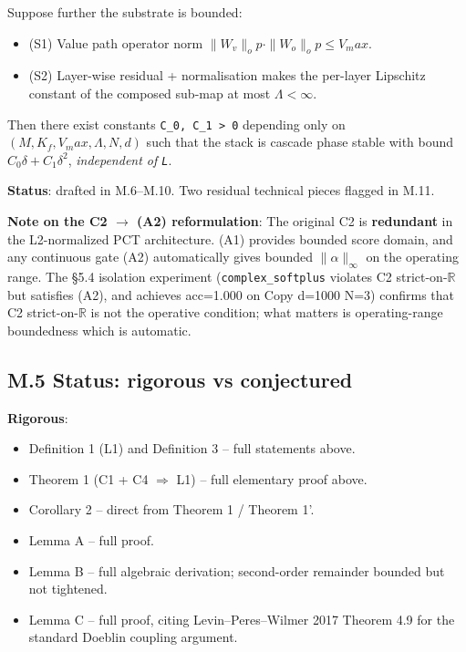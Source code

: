 \documentclass[11pt,a4paper]{article}
\theoremstyle{plain}
\theoremstyle{definition}
\begin{document}
Suppose further the substrate is bounded:

\begin{itemize}
  \item (S1) Value path operator norm $\|W_v\|_op \cdot  \|W_o\|_op \le  V_max$.
  \item (S2) Layer-wise residual + normalisation makes the per-layer Lipschitz constant of the composed sub-map at most $\Lambda  < \infty $.
\end{itemize}

Then there exist constants \texttt{C\_0, C\_1 > 0} depending only on $(M, K_f, V_max, \Lambda , N, d)$ such that the stack is cascade phase stable with bound $C_0 \delta  + C_1 \delta ^2$, \emph{independent of \texttt{L}}.

\textbf{Status}: drafted in M.6--M.10. Two residual technical pieces flagged in M.11.

\textbf{Note on the C2 $\to$ (A2) reformulation}: The original C2 is \textbf{redundant} in the L2-normalized PCT architecture. (A1) provides bounded score domain, and any continuous gate (A2) automatically gives bounded $\|\alpha \|_\infty $ on the operating range. The \S{}5.4 isolation experiment (\texttt{complex\_softplus} violates C2 strict-on-$\mathbb{R}$ but satisfies (A2), and achieves acc=1.000 on Copy d=1000 N=3) confirms that C2 strict-on-$\mathbb{R}$ is not the operative condition; what matters is operating-range boundedness which is automatic.

\subsection{M.5 Status: rigorous vs conjectured}
\textbf{Rigorous}:

\begin{itemize}
  \item Definition 1 (L1) and Definition 3 -- full statements above.
  \item Theorem 1 (C1 + C4 $\Rightarrow$ L1) -- full elementary proof above.
  \item Corollary 2 -- direct from Theorem 1 / Theorem 1'.
  \item Lemma A -- full proof.
  \item Lemma B -- full algebraic derivation; second-order remainder bounded but not tightened.
  \item Lemma C -- full proof, citing Levin--Peres--Wilmer 2017 Theorem 4.9 for the standard Doeblin coupling argument.
\end{itemize}
\end{document}
